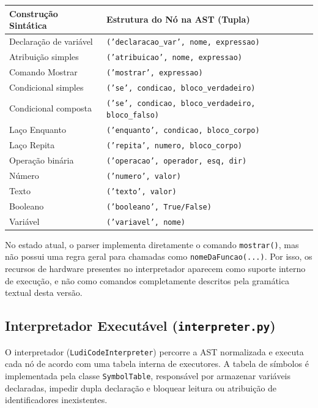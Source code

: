 \documentclass[12pt,a4paper]{article}
\begin{document}
\begin{center}
\begin{tabular}{lp{8.5cm}}
\hline
\textbf{Construção Sintática} & \textbf{Estrutura do Nó na AST (Tupla)} \\
\hline
Declaração de variável & \texttt{('declaracao\_var', nome, expressao)} \\
Atribuição simples     & \texttt{('atribuicao', nome, expressao)} \\
Comando Mostrar        & \texttt{('mostrar', expressao)} \\
Condicional simples    & \texttt{('se', condicao, bloco\_verdadeiro)} \\
Condicional composta   & \texttt{('se', condicao, bloco\_verdadeiro, bloco\_falso)} \\
Laço Enquanto          & \texttt{('enquanto', condicao, bloco\_corpo)} \\
Laço Repita            & \texttt{('repita', numero, bloco\_corpo)} \\
Operação binária       & \texttt{('operacao', operador, esq, dir)} \\
Número                 & \texttt{('numero', valor)} \\
Texto                  & \texttt{('texto', valor)} \\
Booleano               & \texttt{('booleano', True/False)} \\
Variável               & \texttt{('variavel', nome)} \\
\hline
\end{tabular}
\end{center}

No estado atual, o parser implementa diretamente o comando \texttt{mostrar()}, mas não possui uma regra geral para chamadas como \texttt{nomeDaFuncao(...)}. Por isso, os recursos de hardware presentes no interpretador aparecem como suporte interno de execução, e não como comandos completamente descritos pela gramática textual desta versão.


\subsection{Interpretador Executável (\texttt{interpreter.py})}

O interpretador (\texttt{LudiCodeInterpreter}) percorre a AST normalizada e executa cada nó de acordo com uma tabela interna de executores. A tabela de símbolos é implementada pela classe \texttt{SymbolTable}, responsável por armazenar variáveis declaradas, impedir dupla declaração e bloquear leitura ou atribuição de identificadores inexistentes.
\end{document}
